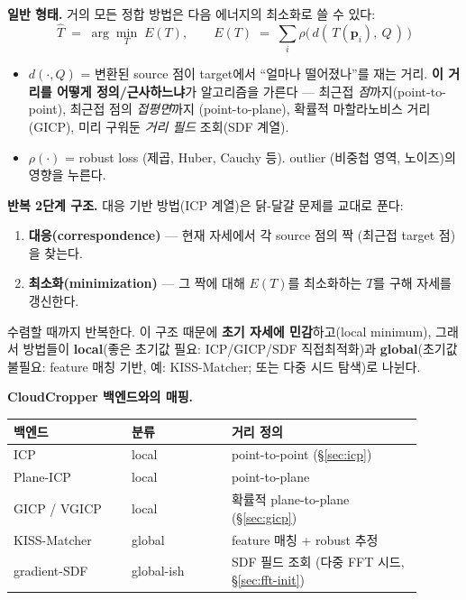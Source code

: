 \textbf{일반 형태.} 거의 모든 정합 방법은 다음 에너지의 최소화로 쓸 수 있다:
\begin{equation*}
  \hat{T} \;=\; \arg\min_{T}\; E(T), \qquad
  E(T) \;=\; \sum_{i} \rho\big(\, d(\,T(\mathbf{p}_i),\ Q\,) \,\big)
\end{equation*}
\begin{itemize}
  \item $d(\cdot, Q)$ = 변환된 source 점이 target에서 ``얼마나 떨어졌나''를
  재는 거리. \textbf{이 거리를 어떻게 정의/근사하느냐}가 알고리즘을 가른다 ---
  최근접 \emph{점}까지(point-to-point), 최근접 점의 \emph{접평면}까지
  (point-to-plane), 확률적 마할라노비스 거리(GICP), 미리 구워둔 \emph{거리
  필드} 조회(SDF 계열).
  \item $\rho(\cdot)$ = robust loss (제곱, Huber, Cauchy 등). outlier
  (비중첩 영역, 노이즈)의 영향을 누른다.
\end{itemize}

\textbf{반복 2단계 구조.} 대응 기반 방법(ICP 계열)은 닭-달걀 문제를 교대로
푼다:
\begin{enumerate}
  \item \textbf{대응(correspondence)} --- 현재 자세에서 각 source 점의 짝
  (최근접 target 점)을 찾는다.
  \item \textbf{최소화(minimization)} --- 그 짝에 대해 $E(T)$를 최소화하는
  $T$를 구해 자세를 갱신한다.
\end{enumerate}
수렴할 때까지 반복한다. 이 구조 때문에 \textbf{초기 자세에 민감}하고(local
minimum), 그래서 방법들이 \textbf{local}(좋은 초기값 필요: ICP/GICP/SDF
직접최적화)과 \textbf{global}(초기값 불필요: feature 매칭 기반, 예:
KISS-Matcher; 또는 다중 시드 탐색)로 나뉜다.

\textbf{CloudCropper 백엔드와의 매핑.}
\begin{longtable}{p{0.26\linewidth}p{0.22\linewidth}p{0.42\linewidth}}
\toprule
\textbf{백엔드} & \textbf{분류} & \textbf{거리 정의} \\
\midrule
ICP & local & point-to-point (\S\ref{sec:icp}) \\
Plane-ICP & local & point-to-plane \\
GICP / VGICP & local & 확률적 plane-to-plane (\S\ref{sec:gicp}) \\
KISS-Matcher & global & feature 매칭 + robust 추정 \\
gradient-SDF & global-ish & SDF 필드 조회 (다중 FFT 시드,
  \S\ref{sec:fft-init}) \\
\bottomrule
\end{longtable}

